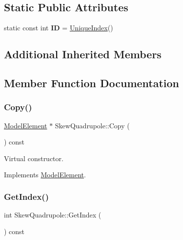 \subsection*{Static Public Attributes}
\begin{DoxyCompactItemize}
\item 
\mbox{\label{classSkewQuadrupole_aa70d5e4a3132a88639563f544b565d2b}} 
static const int {\bfseries ID} = \hyperlink{classAcceleratorComponent_aa7ad4d39e1a488b705983842ed1ac784}{Unique\+Index}()
\end{DoxyCompactItemize}
\subsection*{Additional Inherited Members}


\subsection{Member Function Documentation}
\mbox{\label{classSkewQuadrupole_af5c7ad09d1966dfd71144e6e08942a53}} 
\subsubsection{\texorpdfstring{Copy()}{Copy()}}
{\footnotesize\ttfamily \hyperlink{classModelElement}{Model\+Element} $\ast$ Skew\+Quadrupole\+::\+Copy (\begin{DoxyParamCaption}{ }\end{DoxyParamCaption}) const\hspace{0.3cm}{\ttfamily [virtual]}}

Virtual constructor. 

Implements \hyperlink{classModelElement_ac3ca26d649bd86a0f31a58ae09941429}{Model\+Element}.

\mbox{\label{classSkewQuadrupole_aa3fb2801ec77a1d9d4d7a4d603c2b767}} 
\subsubsection{\texorpdfstring{Get\+Index()}{GetIndex()}}
{\footnotesize\ttfamily int Skew\+Quadrupole\+::\+Get\+Index (\begin{DoxyParamCaption}{ }\end{DoxyParamCaption}) const\hspace{0.3cm}{\ttfamily [virtual]}}

